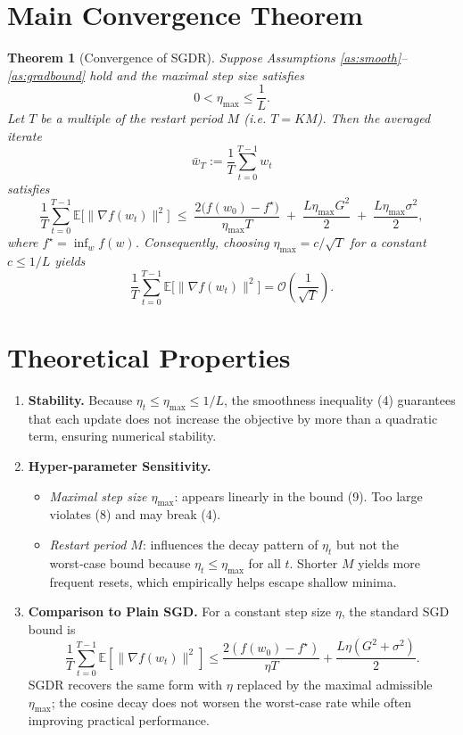 \documentclass{article}
\newtheorem{theorem}{Theorem}
\newcommand{\E}{\mathbb{E}}
\begin{document}
\section*{Main Convergence Theorem}
\begin{theorem}[Convergence of SGDR]\label{thm:sgdr}
Suppose Assumptions \ref{as:smooth}–\ref{as:gradbound} hold and the maximal step size satisfies
\[
0<\eta_{\max}\le\frac{1}{L}.
\tag{8}
\]
Let $T$ be a multiple of the restart period $M$ (i.e. $T=K M$). Then the averaged iterate
\[
\bar w_T:=\frac1T\sum_{t=0}^{T-1}w_t
\]
satisfies
\[
\frac{1}{T}\sum_{t=0}^{T-1}\E\bigl[\|\nabla f(w_t)\|^{2}\bigr]
\;\le\;
\frac{2\bigl(f(w_0)-f^{\star}\bigr)}{\eta_{\max}T}
\;+\;
\frac{L\eta_{\max}G^{2}}{2}
\;+\;
\frac{L\eta_{\max}\sigma^{2}}{2},
\tag{9}
\]
where $f^{\star}=\inf_{w}f(w)$. Consequently, choosing $\eta_{\max}=c/\sqrt{T}$ for a constant $c\le 1/L$ yields
\[
\frac{1}{T}\sum_{t=0}^{T-1}\E\bigl[\|\nabla f(w_t)\|^{2}\bigr]=\mathcal{O}\!\left(\frac{1}{\sqrt{T}}\right).
\tag{10}
\]
\end{theorem}

\section*{Theoretical Properties}
\begin{enumerate}[label=\arabic*.]
\item \textbf{Stability.} Because $\eta_t\le\eta_{\max}\le 1/L$, the smoothness inequality (4) guarantees that each update does not increase the objective by more than a quadratic term, ensuring numerical stability.
\item \textbf{Hyper‑parameter Sensitivity.}
    \begin{itemize}
        \item \emph{Maximal step size $\eta_{\max}$}: appears linearly in the bound (9). Too large violates (8) and may break (4).
        \item \emph{Restart period $M$}: influences the decay pattern of $\eta_t$ but not the worst‑case bound because $\eta_t\le\eta_{\max}$ for all $t$. Shorter $M$ yields more frequent resets, which empirically helps escape shallow minima.
    \end{itemize}
\item \textbf{Comparison to Plain SGD.} For a constant step size $\eta$, the standard SGD bound is
\[
\frac{1}{T}\sum_{t=0}^{T-1}\E[\|\nabla f(w_t)\|^{2}]
\le\frac{2(f(w_0)-f^{\star})}{\eta T}
+\frac{L\eta(G^{2}+\sigma^{2})}{2}.
\]
SGDR recovers the same form with $\eta$ replaced by the maximal admissible $\eta_{\max}$; the cosine decay does not worsen the worst‑case rate while often improving practical performance.
\end{enumerate}
\end{document}
